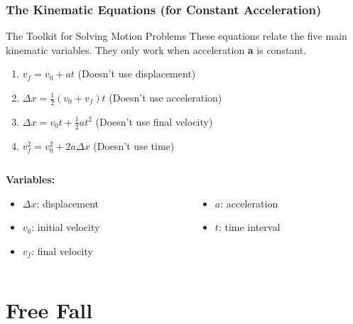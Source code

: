 \documentclass{beamer}
\begin{document}
\begin{frame}
\frametitle{The Kinematic Equations (for Constant Acceleration)}
\begin{block}{The Toolkit for Solving Motion Problems}
These equations relate the five main kinematic variables. They only work when acceleration \textbf{a} is constant.
\end{block}
\begin{enumerate}
    \item $v_f = v_0 + at$ \quad \small{(Doesn't use displacement)}
    \item $\Delta x = \frac{1}{2}(v_0 + v_f)t$ \quad \small{(Doesn't use acceleration)}
    \item $\Delta x = v_0 t + \frac{1}{2}at^2$ \quad \small{(Doesn't use final velocity)}
    \item $v_f^2 = v_0^2 + 2a\Delta x$ \quad \small{(Doesn't use time)}
\end{enumerate}
\vfill
\begin{columns}
    \begin{column}{0.5\textwidth}
        \textbf{Variables:}
        \begin{itemize}
            \item $\Delta x$: displacement
            \item $v_0$: initial velocity
            \item $v_f$: final velocity
        \end{itemize}
    \end{column}
    \begin{column}{0.5\textwidth}
        ~
        \begin{itemize}
            \item $a$: acceleration
            \item $t$: time interval
        \end{itemize}
    \end{column}
\end{columns}
\end{frame}

\section{Free Fall}
\end{document}
